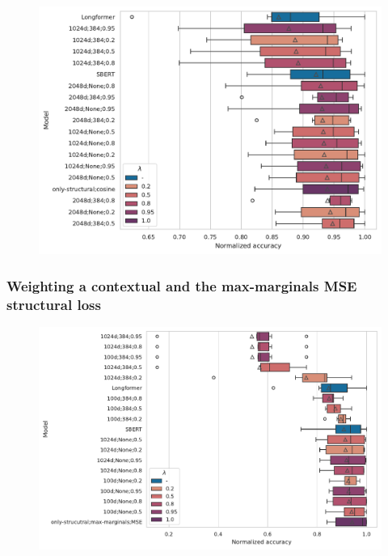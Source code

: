 \begin{figure}

  \includegraphics[width=\textwidth]{img/cos_weighting.pdf}

\end{figure}

\subsubsection{Weighting a contextual and the max-marginals MSE structural
loss}

\begin{figure}

  \includegraphics[width=\textwidth]{img/mm_mse_weighting.pdf}

\end{figure}
